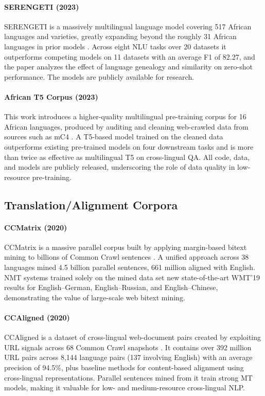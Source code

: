 \documentclass[letterpaper]{article}
\begin{document}
\paragraph{SERENGETI (2023)} SERENGETI is a massively multilingual language model covering 517 African languages and varieties, greatly expanding beyond the roughly 31 African languages in prior models \citep{adebara2023serengetimassivelymultilinguallanguage}. Across eight NLU tasks over 20 datasets it outperforms competing models on 11 datasets with an average F1 of 82.27, and the paper analyzes the effect of language genealogy and similarity on zero-shot performance. The models are publicly available for research.

\paragraph{African T5 Corpus (2023)} This work introduces a higher-quality multilingual pre-training corpus for 16 African languages, produced by auditing and cleaning web-crawled data from sources such as mC4 \citep{oladipo-etal-2023-better}. A T5-based model trained on the cleaned data outperforms existing pre-trained models on four downstream tasks and is more than twice as effective as multilingual T5 on cross-lingual QA. All code, data, and models are publicly released, underscoring the role of data quality in low-resource pre-training.

\subsection{Translation/Alignment Corpora}

\paragraph{CCMatrix (2020)} CCMatrix is a massive parallel corpus built by applying margin-based bitext mining to billions of Common Crawl sentences \citep{schwenk2020ccmatrixminingbillionshighquality}. A unified approach across 38 languages mined 4.5 billion parallel sentences, 661 million aligned with English. NMT systems trained solely on the mined data set new state-of-the-art WMT'19 results for English--German, English--Russian, and English--Chinese, demonstrating the value of large-scale web bitext mining.

\paragraph{CCAligned (2020)} CCAligned is a dataset of cross-lingual web-document pairs created by exploiting URL signals across 68 Common Crawl snapshots \citep{el-kishky-etal-2020-ccaligned}. It contains over 392 million URL pairs across 8,144 language pairs (137 involving English) with an average precision of 94.5\%, plus baseline methods for content-based alignment using cross-lingual representations. Parallel sentences mined from it train strong MT models, making it valuable for low- and medium-resource cross-lingual NLP.
\end{document}
